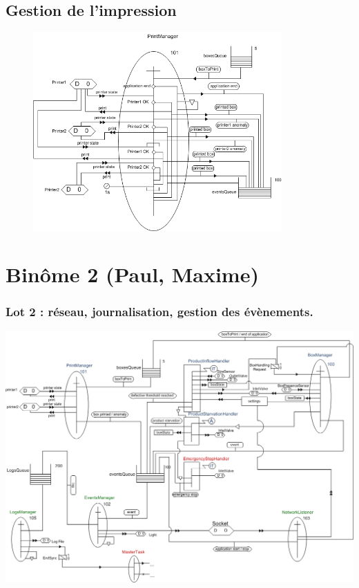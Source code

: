 \documentclass{beamer}
\begin{document}
\subsection{Gestion de l'impression}
	\begin{frame}
	\begin{figure}
		\centering
		\includegraphics[width=0.85\textwidth]{../../SchemasLCG/PrintManager.png}
	\end{figure}
	\end{frame}

\section{Binôme 2 (Paul, Maxime)}
	\begin{frame}
		\begin{center}
			\frametitle{Lot 2 : réseau, journalisation, gestion des évènements.}
			\includegraphics[height=0.8\textheight]{../../SchemasLCG/schemaGlobal.png}
		\end{center}
	\end{frame}
\end{document}
